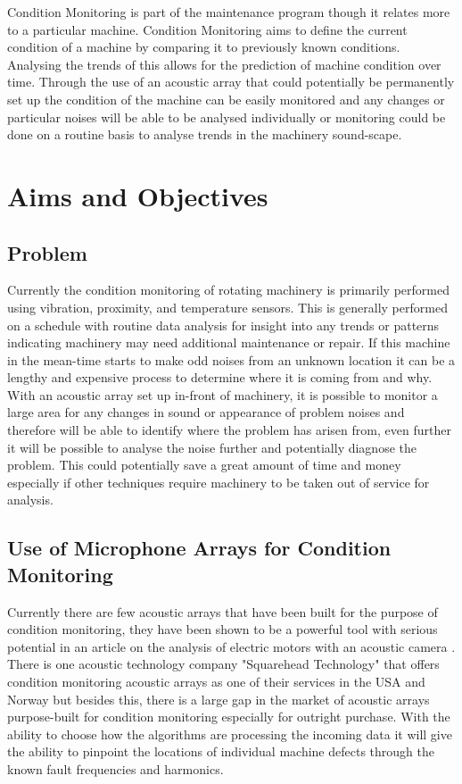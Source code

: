 \documentclass{UoNMCHA}
\numberwithin{equation}{section}
\begin{document}
    Condition Monitoring is part of the maintenance program though it relates more to a particular machine. Condition Monitoring aims to define the current condition of a machine by comparing it to previously known conditions. Analysing the trends of this allows for the prediction of machine condition over time. Through the use of an acoustic array that could potentially be permanently set up the condition of the machine can be easily monitored and any changes or particular noises will be able to be analysed individually or monitoring could be done on a routine basis to analyse trends in the machinery sound-scape.
\newpage
\section{Aims and Objectives} \label{sec:Aims and Objectives}
\subsection{Problem} \label{sec:Problem}
    Currently the condition monitoring of rotating machinery is primarily performed using vibration, proximity, and temperature sensors. This is generally performed on a schedule with routine data analysis for insight into any trends or patterns indicating machinery may need additional maintenance or repair. If this machine in the mean-time starts to make odd noises from an unknown location it can be a lengthy and expensive process to determine where it is coming from and why. With an acoustic array set up in-front of machinery, it is possible to monitor a large area for any changes in sound or appearance of problem noises and therefore will be able to identify where the problem has arisen from, even further it will be possible to analyse the noise further and potentially diagnose the problem. This could potentially save a great amount of time and money especially if other techniques require machinery to be taken out of service for analysis.
\subsection{Use of Microphone Arrays for Condition Monitoring} \label{sec:use for CM}
    Currently there are few acoustic arrays that have been built for the purpose of condition monitoring, they have been shown to be a powerful tool with serious potential in an article on the analysis of electric motors with an acoustic camera \citep{Orm13}. There is one acoustic technology company "Squarehead Technology" that offers condition monitoring acoustic arrays as one of their services in the USA and Norway but besides this, there is a large gap in the market of acoustic arrays purpose-built for condition monitoring especially for outright purchase. With the ability to choose how the algorithms are processing the incoming data it will give the ability to pinpoint the locations of individual machine defects through the known fault frequencies and harmonics.
\end{document}
